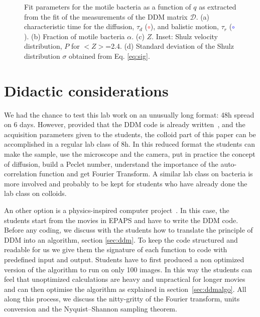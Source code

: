 \documentclass[prb,twocolumn,amsmath,amssymb]{revtex4-1}
\begin{document}
\begin{figure}
	\caption{Fit parameters for the motile bacteria as a function of $q$  as extracted from the fit of the measurements of the DDM matrix $\mathcal{D}$. (a) characteristic time for the diffusion, $\tau_d$ (\textcolor{red}{$\circ$}), and balistic motion, $\tau_r$ (\textcolor{blue}{$\circ$}). (b) Fraction of motile bacteria $\alpha$. (c) $Z$. Inset: Shulz velocity distribution, $P$ for $<Z>$=2.4. (d) Standard deviation of the Shulz distribution $\sigma$ obtained from Eq. \eqref{eq:sig}.}
	\label{fig:FitParametersBacteria}
\end{figure}

\section{Didactic considerations}
\label{sec:didac}
We had the chance to test this lab work on an unusually long format: 48h spread on 6 days. However, provided that the DDM code is already written~\cite{code_github}, and the acquisition parameters given to the students, the colloid part of this paper can be accomplished in a regular lab class of 8h. In this reduced format the students can make the sample, use the microscope and the camera, put in practice the concept of diffusion, build a Peclet number, understand the importance of the auto-correlation function and get Fourier Transform. A similar lab class on bacteria is more involved and probably to be kept for students who have already done the lab class on colloids.

An other option is a physics-inspired computer project~\cite{ajp2005spencer, ajp2014deutsh}. In this case, the students start from the movies in EPAPS and have to write the DDM code. Before any coding, we discuss with the students how to translate the principle of DDM into an algorithm, section \ref{sec:ddm}. To keep the code structured and readable for us we give them the signature of each function to code with predefined input and output. Students have to first produced a non optimized version of the algorithm to run on only 100 images. In this way the students can feel that unoptimized  calculations are heavy and unpractical for longer movies and can then optimise the algorithm as explained in section~\ref{sec:ddmalgo}. All along this process, we discuss the nitty-gritty of the Fourier transform, units conversion and the Nyquist–Shannon sampling theorem.
\end{document}
